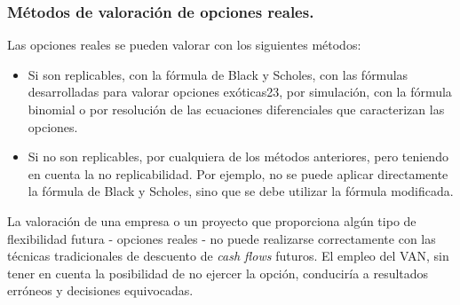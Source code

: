 \subsubsection*{Métodos de valoración de opciones reales.}

Las opciones reales se pueden valorar con los siguientes métodos:\\

\begin{itemize}
	\item Si son replicables, con la fórmula de Black y Scholes, con las fórmulas desarrolladas para valorar opciones exóticas23, por simulación, con la fórmula binomial o por resolución de las ecuaciones diferenciales que caracterizan las opciones.
	
\item Si no son replicables, por cualquiera de los métodos anteriores, pero teniendo en cuenta la no replicabilidad. Por ejemplo, no se puede aplicar directamente la fórmula de Black y Scholes, sino que se debe utilizar la fórmula modificada.

\end{itemize}

La valoración de una empresa o un proyecto que proporciona algún tipo de flexibilidad futura - opciones reales - no puede realizarse correctamente con las técnicas tradicionales de descuento de \textit{cash flows} futuros. El empleo del VAN, sin tener en cuenta la posibilidad de no ejercer la opción, conduciría a resultados erróneos y decisiones equivocadas.\\

